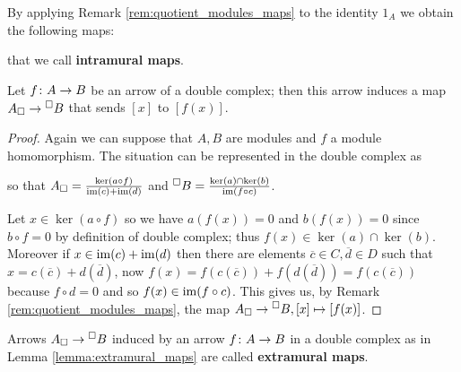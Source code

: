 \begin{definition}
  \label{def:intramural_maps}
  By applying Remark \ref{rem:quotient_modules_maps} to the identity \(1_A\) we obtain the following maps:
  \begin{center}
  \end{center}
  that we call {\bf intramural maps}.      
\end{definition}

\begin{lemma}
  \label{lemma:extramural_maps}
  Let \(f\colon A\to B\) be an arrow of a double complex; then this arrow induces a map \({A}_{\Box}\to{}^{\Box}{B}\) that sends \([x]\) to \([f(x)]\).
\end{lemma}

\begin{proof}
  Again we can suppose that \(A, B\) are modules and \(f\) a module homomorphism. The situation can be represented in the double complex as
  \begin{center}
  \end{center}
  so that \({A}_{\Box}=\frac{\ker(a\circ f)}{\operatorname{im}(c) + \operatorname{im}(d)}\) and \({}^{\Box}{B}=\frac{\ker(a)\cap\ker(b)}{\operatorname{im}(f\circ c)}\).

  Let \(x\in\ker(a\circ f)\) so we have \(a(f(x)) = 0\) and \(b(f(x)) = 0\) since \(b\circ f = 0\) by definition of double complex; thus \(f(x)\in\ker(a)\cap\ker(b)\). Moreover if \(x\in\operatorname{im}(c)+\operatorname{im}(d)\) then there are elements \(\overline{c}\in C,\overline{d}\in D\) such that \(x = c(\overline{c}) + d(\overline{d})\), now \(f(x) = f(c(\overline{c})) + f(d(\overline{d})) = f(c(\overline{c}))\) because \(f\circ d = 0\) and so \(f(x)\in\operatorname{im}(f\circ c)\). This gives us, by Remark \ref{rem:quotient_modules_maps}, the map \({A}_{\Box}\to{}^{\Box}{B},[x]\mapsto [f(x)]\).
\end{proof}

\begin{definition}
  \label{def:extramural_maps}
  Arrows \({A}_{\Box}\to{}^{\Box}{B}\) induced by an arrow \(f\colon A\to B\) in a double complex as in Lemma \ref{lemma:extramural_maps} are called {\bf extramural maps}.
\end{definition}

